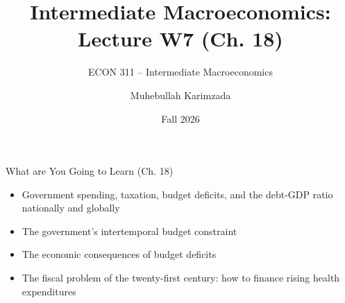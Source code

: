 \documentclass[aspectratio=1610]{beamer}
\title[Winter - Lecture 7] %
{Intermediate Macroeconomics: Lecture  W7 (Ch. 18)}
\subtitle{ECON 311 -- Intermediate Macroeconomics}
\author{Muhebullah Karimzada}
\institute{School of Economics \\\ University of Northern British Columbia}
\date{Fall 2026}
\begin{document}
\begin{frame}[plain]
  \titlepage
\end{frame}


\begin{frame}[wide]{What are You Going to Learn (Ch. 18)}
	\begin{itemize}
		\item Government spending, taxation, budget deficits, and the debt-GDP ratio nationally and globally
		\vspace{3mm}
		\item The government’s intertemporal budget constraint
		\vspace{3mm}
		\item The economic consequences of budget deficits
		\vspace{3mm}
		\item The fiscal problem of the twenty-first century: how to finance rising health expenditures
	\end{itemize}
\end{frame}

%		
\end{document}
